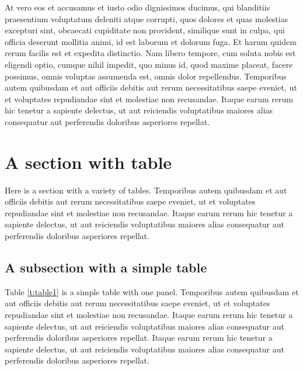 \documentclass[letterpaper,11pt,leqno]{article}
\begin{document}
At vero eos et accusamus et iusto odio dignissimos ducimus, qui blanditiis praesentium voluptatum deleniti atque corrupti, quos dolores et quas molestias excepturi sint, obcaecati cupiditate non provident, similique sunt in culpa, qui officia deserunt mollitia animi, id est laborum et dolorum fuga. Et harum quidem rerum facilis est et expedita distinctio. Nam libero tempore, cum soluta nobis est eligendi optio, cumque nihil impedit, quo minus id, quod maxime placeat, facere possimus, omnis voluptas assumenda est, omnis dolor repellendus. Temporibus autem quibusdam et aut officiis debitis aut rerum necessitatibus saepe eveniet, ut et voluptates repudiandae sint et molestiae non recusandae. Itaque earum rerum hic tenetur a sapiente delectus, ut aut reiciendis voluptatibus maiores alias consequatur aut perferendis doloribus asperiores repellat. 

\section{A section with table}

Here is a section with a variety of tables. Temporibus autem quibusdam et aut officiis debitis aut rerum necessitatibus saepe eveniet, ut et voluptates repudiandae sint et molestiae non recusandae. Itaque earum rerum hic tenetur a sapiente delectus, ut aut reiciendis voluptatibus maiores alias consequatur aut perferendis doloribus asperiores repellat. 

\subsection{A subsection with a simple table}

Table \ref{t:table1} is a simple table with one panel. Temporibus autem quibusdam et aut officiis debitis aut rerum necessitatibus saepe eveniet, ut et voluptates repudiandae sint et molestiae non recusandae. Itaque earum rerum hic tenetur a sapiente delectus, ut aut reiciendis voluptatibus maiores alias consequatur aut perferendis doloribus asperiores repellat. Itaque earum rerum hic tenetur a sapiente delectus, ut aut reiciendis voluptatibus maiores alias consequatur aut perferendis doloribus asperiores repellat. 
\end{document}

